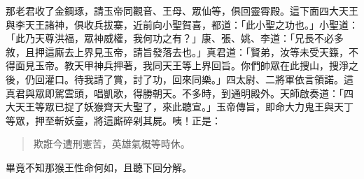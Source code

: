 那老君收了金鋼琢，請玉帝同觀音、王母、眾仙等，俱回靈霄殿。這下面四大天王與李天王諸神，俱收兵拔寨，近前向小聖賀喜，都道：「此小聖之功也。」小聖道：「此乃天尊洪福，眾神威權，我何功之有？」康、張、姚、李道：「兄長不必多敘，且押這廝去上界見玉帝，請旨發落去也。」真君道：「賢弟，汝等未受天籙，不得面見玉帝。教天甲神兵押著，我同天王等上界回旨。你們帥眾在此搜山，搜淨之後，仍回灌口。待我請了賞，討了功，回來同樂。」四太尉、二將軍依言領諾。這真君與眾即駕雲頭，唱凱歌，得勝朝天。不多時，到通明殿外。天師啟奏道：「四大天王等眾已捉了妖猴齊天大聖了，來此聽宣。」玉帝傳旨，即命大力鬼王與天丁等眾，押至斬妖臺，將這廝碎剁其屍。咦！正是：
\begin{quote}
欺誑今遭刑憲苦，英雄氣概等時休。
\end{quote}

畢竟不知那猴王性命何如，且聽下回分解。
